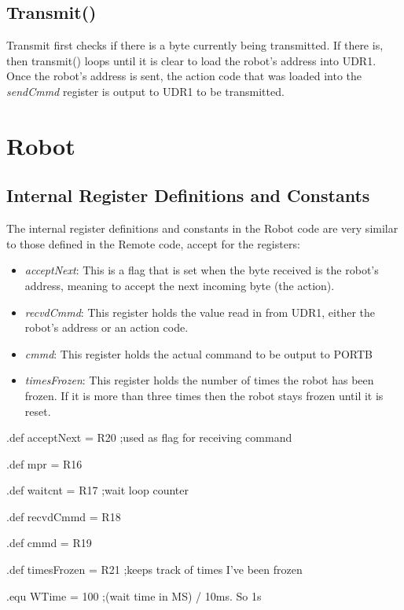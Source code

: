 \documentclass[12pt,letterpaper]{article}
\begin{document}
\subsection{Transmit()}
	Transmit first checks if there is a byte currently being transmitted.
	If there is, then transmit() loops until it is clear to load the robot's address into UDR1.
	Once the robot's address is sent, the action code that was loaded into the \textit{sendCmmd} register is output to UDR1 to be transmitted.
	

\section{Robot}
\subsection{Internal Register Definitions and Constants}
The internal register definitions and constants in the Robot code are very similar to those defined in the Remote code, accept for the registers: 
\begin{itemize}
	\item \textit{acceptNext}: This is a flag that is set when the byte received is the robot's address, meaning to accept the next incoming byte (the action).
	
	\item \textit{recvdCmmd}: This register holds the value read in from UDR1, either the robot's address or an action code.
	
	\item \textit{cmmd}: This register holds the actual command to be output to PORTB
	
	\item \textit{timesFrozen}: This register holds the number of times the robot has been frozen. If it is more than three times then the robot stays frozen until it is reset.
	
\end{itemize}

.def  acceptNext = R20				\hfill	;used as flag for receiving command

.def  mpr = R16

.def  waitcnt = R17					\hfill	;wait loop counter

.def  recvdCmmd = R18

.def  cmmd = R19

.def  timesFrozen = R21 			\hfill	;keeps track of times I've been frozen

.equ  WTime = 100					\hfill	;(wait time in MS) / 10ms. So 1s
\end{document}

